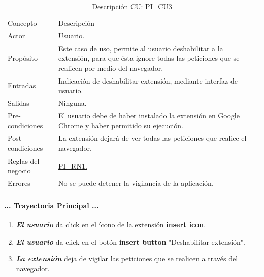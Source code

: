 \documentclass[12pt, a4paper, titlepage]{article}
\begin{document}
				\newpage
				\begin{table}[htb]
				\begin{center}
				\begin{tabular}{ |p{3.5cm}||p{9.5cm}|}
					\hline
					\rowcolor{guindapoli}
					\multicolumn{2}{|c|}{\textbf{\textcolor{white}{Caso de uso: PI\_CU3. Deshabilitar extensión.}}}\\
					\hline
					\rowcolor{azulfuerte}Concepto & Descripción\\
					\hline
					\cellcolor{azulclaro}Actor & 
					Usuario.\\ 
					\hline
					\cellcolor{azulclaro}Propósito &
					Este caso de uso, permite al usuario deshabilitar a la extensión, para que ésta ignore todas las peticiones que se realicen por medio del navegador.\\
					\hline
					\cellcolor{azulclaro}Entradas &
					Indicación de deshabilitar extensión, mediante interfaz de usuario.\\
					\hline
					\cellcolor{azulclaro}Salidas &
					Ninguna.\\
					\hline
					\cellcolor{azulclaro}Pre-condiciones&
					El usuario debe de haber instalado la extensión en Google Chrome y haber permitido su ejecución.\\
					\hline
					\cellcolor{azulclaro}Post-condiciones&
					La extensión dejará de ver todas las peticiones que realice el navegador.\\
					\hline
					\cellcolor{azulclaro}Reglas del negocio&
					\hyperref[PI_RN1]{PI\_RN1.}\\
					\hline
					\cellcolor{azulclaro}Errores &
					No se puede detener la vigilancia de la aplicación.\\
					\hline
				\end{tabular}
				\caption[DCU: PI\_CU3]{Descripción CU: PI\_CU3}
				\end{center}
				\end{table}
			
				\paragraph{... Trayectoria Principal ...}
				\begin{enumerate}
					\item \textbf{\textit{El usuario}} da click en el ícono de la extensión \textbf{insert icon}.
					\item \textbf{\textit{El usuario}} da click en el botón \textbf{insert button} "Deshabilitar extensión".
					\item \textbf{\textit{La extensión}} deja de vigilar las peticiones que se realicen a través del navegador.
				\end{enumerate}
\end{document}
